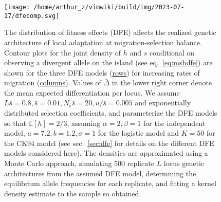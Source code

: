 \documentclass[
  11pt,
]{article}
\begin{document}
\begin{figure}
\hypertarget{fig:dfecomp}{%
\centering
\texttt{[image: /home/arthur\_z/vimwiki/build/img/2023-07-17/dfecomp.svg]}
\caption{The distribution of fitness effects (DFE) affects the realized
genetic architecture of local adaptation at migration-selection balance.
Contour plots for the joint density of \(h\) and \(s\) conditional on
observing a divergent allele on the island (see eq.~\ref{eq:msbdfe}) are
shown for the three DFE models (\uline{rows}) for increasing rates of
migration (\uline{columns}). Values of \(\bar{\Delta}\) in the lower
right corner denote the mean expected differentiation per locus. We
assume \(L\bar{s}=0.8, \bar{s}=0.01, N_e\bar{s}=20, u/\bar{s}=0.005\)
and exponentially distributed selection coefficients, and parameterize
the DFE models so that \(\mathbb{E}[h] = 2/3\), assuming
\(\alpha=2, \beta=1\) for the independent model,
\(a=7.2, b=1.2, \sigma=1\) for the logistic model and \(K=50\) for the
CK94 model (see sec.~\ref{sec:dfe} for details on the different DFE
models considered here). The densities are approximated using a Monte
Carlo approach, simulating 500 replicate \(L\) locus genetic
architectures from the assumed DFE model, determining the equilibrium
allele frequencies for each replicate, and fitting a kernel density
estimate to the sample so obtained.}\label{fig:dfecomp}
}
\end{figure}
\end{document}
